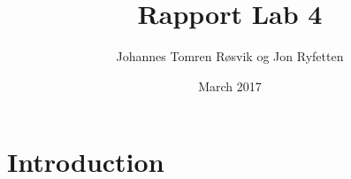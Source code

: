 \documentclass{article}
\title{Rapport Lab 4}
\author{Johannes Tomren Røsvik og Jon Ryfetten}
\date{March 2017}
\begin{document}
\maketitle

\section{Introduction}
\end{document}
